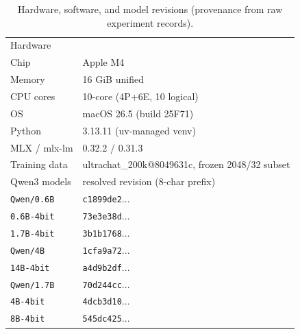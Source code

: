 \begin{table}[t]\centering
\caption{Hardware, software, and model revisions (provenance from raw experiment records).}
\label{tab:setup}
\footnotesize
\begin{tabular}{@{}p{1.9cm}p{3.6cm}@{}}
\toprule
Hardware & \\
\quad Chip & Apple M4\\
\quad Memory & 16 GiB unified\\
\quad CPU cores & 10-core (4P+6E, 10 logical)\\
OS & macOS 26.5 (build 25F71)\\
Python & 3.13.11 (uv-managed venv)\\
MLX / mlx-lm & 0.32.2 / 0.31.3\\
Training data & ultrachat\_200k@8049631c, frozen 2048/32 subset\\
\midrule
Qwen3 models & resolved revision (8-char prefix)\\
\quad \texttt{Qwen/0.6B} & \texttt{c1899de2}...\\
\quad \texttt{0.6B-4bit} & \texttt{73e3e38d}...\\
\quad \texttt{1.7B-4bit} & \texttt{3b1b1768}...\\
\quad \texttt{Qwen/4B} & \texttt{1cfa9a72}...\\
\quad \texttt{14B-4bit} & \texttt{a4d9b2df}...\\
\quad \texttt{Qwen/1.7B} & \texttt{70d244cc}...\\
\quad \texttt{4B-4bit} & \texttt{4dcb3d10}...\\
\quad \texttt{8B-4bit} & \texttt{545dc425}...\\
\bottomrule
\end{tabular}
\end{table}
